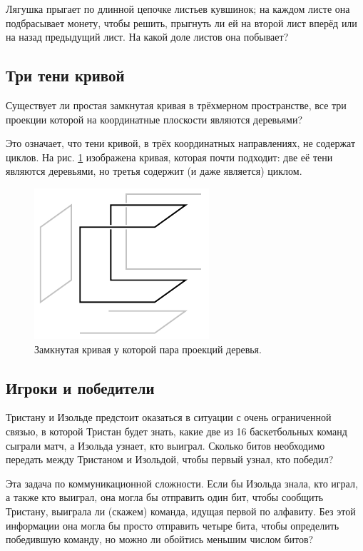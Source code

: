 Лягушка прыгает по длинной цепочке листьев кувшинок;
на каждом листе она подбрасывает монету, чтобы решить, прыгнуть ли ей на второй лист вперёд или на назад предыдущий лист.
На какой доле листов она побывает?

\subsection*{Три тени кривой}

Существует ли простая замкнутая кривая в трёхмерном пространстве, все три проекции которой на координатные плоскости являются деревьями?

Это означает, что тени кривой, в трёх координатных направлениях, не содержат циклов.
На рис. \ref{pic:proj1} изображена кривая, которая почти подходит: две её тени являются деревьями, но третья содержит (и даже является) циклом.

\begin{figure}[htb!]
\centering
\includegraphics[scale=1]{pics/proj1}
\caption{Замкнутая кривая у которой пара проекций деревья.}
\label{pic:proj1}
\end{figure}

\subsection*{Игроки и победители}

Тристану и Изольде предстоит оказаться в ситуации с очень ограниченной связью, в которой Тристан будет знать, какие две из 16 баскетбольных команд сыграли матч, а Изольда узнает, кто выиграл.
Сколько битов необходимо передать между Тристаном и Изольдой, чтобы первый узнал, кто победил?

Эта задача по коммуникационной сложности.
Если бы Изольда знала, кто играл, а также кто выиграл, она могла бы отправить один бит, чтобы сообщить Тристану, выиграла ли (скажем) команда, идущая первой по алфавиту.
Без этой информации она могла бы просто отправить четыре бита, чтобы определить победившую команду, но можно ли обойтись меньшим числом битов?

